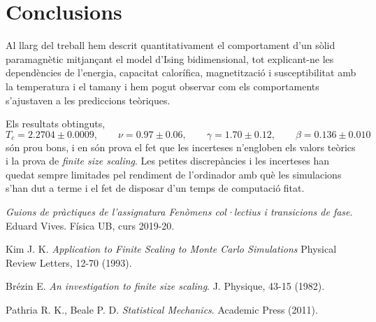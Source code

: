 \documentclass[a4paper]{article}
\begin{document}
\newpage
\section{Conclusions}
Al llarg del treball hem descrit quantitativament el comportament d'un sòlid paramagnètic mitjançant el model d'Ising bidimensional, tot explicant-ne les dependències de l'energia, capacitat calorífica, magnetització i susceptibilitat amb la temperatura i el tamany i hem pogut observar com els comportaments s'ajustaven a les prediccions teòriques.

Els resultats obtinguts,
\begin{equation*}
    T_c = 2.2704 \pm 0.0009, \qquad \nu = 0.97 \pm 0.06, \qquad \gamma = 1.70 \pm 0.12, \qquad \beta = 0.136 \pm 0.010
\end{equation*}
són prou bons, i en són prova el fet que les incerteses n'engloben els valors teòrics i la prova de \textit{finite size scaling}. Les petites discrepàncies i les incerteses han quedat sempre limitades pel rendiment de l'ordinador amb què les simulacions s'han dut a terme i el fet de disposar d'un temps de computació fitat.

\begin{thebibliography}{9}
\textit{Guions de pràctiques de l'assignatura Fenòmens col·lectius i transicions de fase}. Eduard Vives. Física UB, curs 2019-20.

Kim J. K. \textit{Application to Finite Scaling to Monte Carlo Simulations} Physical Review Letters, 12-70 (1993).

Brézin E. \textit{An investigation to finite size scaling}. J. Physique, 43-15 (1982).

Pathria R. K., Beale P. D. \textit{Statistical Mechanics}. Academic Press (2011).

\end{thebibliography}
\end{document}
